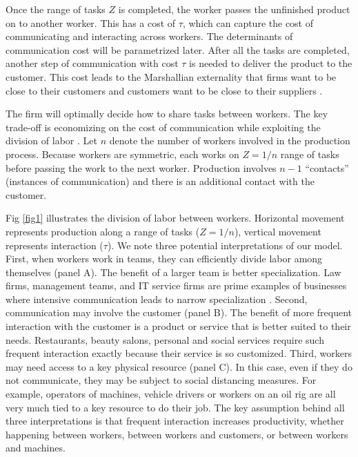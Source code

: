 Once the range of tasks $Z$ is completed, the worker passes the unfinished product on to another worker. This has a cost of $\tau$, which can capture the cost of communicating and interacting across workers. The determinants of communication cost will be parametrized later. After all the tasks are completed, another step of communication with cost $\tau$ is needed to deliver the product to the customer. This cost leads to the Marshallian externality that firms want to be close to their customers and customers want to be close to their suppliers \cite{Marshall1920-ps,Krugman1991-gr}.

The firm will optimally decide how to share tasks between workers. The key trade-off is economizing on the cost of communication while exploiting the division of labor \cite{Becker1992-ac}. Let $n$ denote the number of workers involved in the production process. Because workers are symmetric, each works on $Z=1/n$ range of tasks before passing the work to the next worker. Production involves $n-1$ ``contacts'' (instances of communication) and there is an additional contact with the customer. 

Fig \ref{fig1} illustrates the division of labor between workers. Horizontal movement represents production along a range of tasks ($Z=1/n$), vertical movement represents interaction ($\tau$). We note three potential interpretations of our model. First, when workers work in teams, they can efficiently divide labor among themselves (panel A). The benefit of a larger team is better specialization. Law firms, management teams, and IT service firms are prime examples of businesses where intensive communication leads to narrow specialization \cite{Garicano2009-jv}. Second, communication may involve the customer (panel B). The benefit of more frequent interaction with the customer is a product or service that is better suited to their needs. Restaurants, beauty salons, personal and social services require such frequent interaction exactly because their service is so customized. Third, workers may need access to a key physical resource (panel C). In this case, even if they do not communicate, they may be subject to social distancing measures. For example, operators of machines, vehicle drivers or workers on an oil rig are all very much tied to a key resource to do their job. The key assumption behind all three interpretations is that frequent interaction increases productivity, whether happening between workers, between workers and customers, or between workers and machines.

